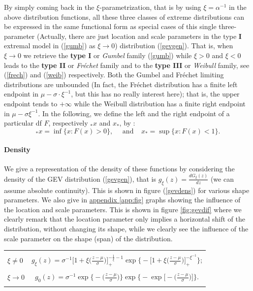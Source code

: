 \documentclass[11pt,a4paper,openany ]{book}
\begin{document}
By simply coming back in the $\xi$-parametrization, that is by using $\xi=\alpha^{-1}$ in the above distribution functions,  all these three classes of extreme distributions can be expressed in the same functional form as special cases of this single three-parameter (Actually, there are just location and scale parameters in the type \textbf{I} extremal model in (\ref{gumb})  as $\xi\to 0$) distribution (\ref{gevgen}).
That is, when $\xi\rightarrow 0$ we retrieve the \textbf{type I} or \emph{Gumbel} family (\ref{gumb}) while $\xi >0$ and $\xi <0$ leads to the \textbf{type II}  or \emph{Fréchet} family and to the \textbf{type III} or \emph{Weibull} family, see (\ref{frech}) and (\ref{weib}) respectively. Both the Gumbel and Fréchet limiting distributions are unbounded (In fact, the Fréchet distribution has a finite left endpoint in $\mu-\sigma\cdot\xi^{-1}$, but this has no really interest here); that is, the upper endpoint tends to $+\infty$ while the Weibull distribution has a finite right endpoint in $\mu-\sigma\xi^{-1}$. In the following, we define the left and the right endpoint of a particular df $F$, respectively $_*x$ and $x_*$, by :
\begin{equation*}
_*x=\inf\{x:F(x)>0\}, \ \ \ \ \ \ \text{and} \ \ \ \ \  x_*=\sup\{x:F(x)<1\}.
\end{equation*}



\paragraph*{Density}We give a representation of the density of these functions by considering the density of the GEV distribution (\ref{gevgen}), that is $g_{\xi}(z)=\frac{d G_{\xi}(z)}{dz}$ (we can assume absolute continuity). This is shown in figure (\ref{gevdens}) for various shape parameters. We also give in \hyperref[app:fig]{appendix \ref{app:fig}} graphs showing the influence of the location and scale parameters. This is shown in figure \ref{fig:gevdif} where we clearly remark that the location parameter only implies a horizontal shift of the distribution, without changing its shape, while we clearly see the influence of the scale parameter on the shape (span) of the distribution.


\begin{tabular}{l|c}
\\[-1.8ex]\hline 
\hline \\
$\xi\neq 0$ &  $g_{\xi}(z)=\sigma^{-1}\bigg[1+\xi\bigg(\frac{z-\mu}{\sigma}\bigg)\bigg]_+^{-\frac{1}{\xi}-1}\exp\Bigg\{-\bigg[1+\xi\bigg(\frac{z-\mu}{\sigma}\bigg)\bigg]_+^{-\xi^{-1}}\Bigg\}$; \\
 \hline  \vspace{.1cm} \\
$\xi\to0$ & $g_0(z)= \sigma^{-1}\exp\bigg\{-\bigg(\frac{z-\mu}{\sigma}\bigg)\bigg\}\exp\Bigg\{-\exp\bigg[-\bigg(\frac{z-\mu}{\sigma}\bigg)\bigg]\Bigg\}$. \\ 
\hline \\ 
\end{tabular}
\end{document}
